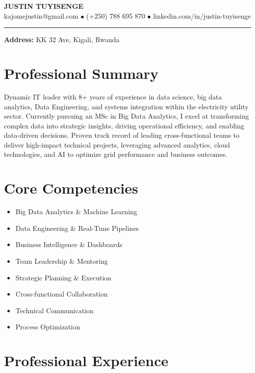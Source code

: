 \documentclass[11pt,letterpaper]{article}
\newcommand{\cvheader}[4]{
	\begin{center}
		{\LARGE\bfseries\color{primarycolor}#1}\\[8pt]
		\color{secondarycolor}
		#2 $\bullet$ #3 $\bullet$ #4\\[4pt]
		\textcolor{lightgray}{\rule{0.8\textwidth}{1pt}}
	\end{center}
	\vspace{12pt}
}
\begin{document}
	
	\cvheader{JUSTIN TUYISENGE}
	{kajomejustin@gmail.com}
	{(+250) 788 695 870}
	{linkedin.com/in/justin-tuyisenge}
	
	\noindent\textbf{Address:} KK 32 Ave, Kigali, Rwanda
	
	\vspace{12pt}
	
	\section*{Professional Summary}
	Dynamic IT leader with 8+ years of experience in data science, big data analytics, Data Engineering, and systems integration within the electricity utility sector. Currently pursuing an MSc in Big Data Analytics, I excel at transforming complex data into strategic insights, driving operational efficiency, and enabling data-driven decisions. Proven track record of leading cross-functional teams to deliver high-impact technical projects, leveraging advanced analytics, cloud technologies, and AI to optimize grid performance and business outcomes.
	
	\section*{Core Competencies}
	\begin{multicols}{2}
		\begin{itemize}[leftmargin=*,itemsep=2pt]
			\item Big Data Analytics \& Machine Learning
			\item Data Engineering \& Real-Time Pipelines
			\item Business Intelligence \& Dashboards
			\item Team Leadership \& Mentoring
			\item Strategic Planning \& Execution
			\item Cross-functional Collaboration
			\item Technical Communication
			\item Process Optimization
		\end{itemize}
	\end{multicols}
	
	\section*{Professional Experience}
	
\end{document}
